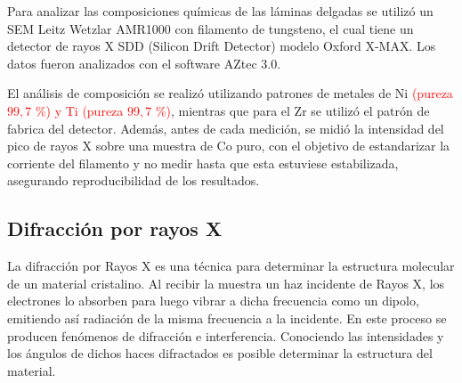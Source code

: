 \documentclass[12pt]{article}
\theoremstyle{definition}
\theoremstyle{remark}
\begin{document}
Para analizar las composiciones químicas de las láminas delgadas se utilizó un SEM Leitz Wetzlar AMR1000 con filamento de tungsteno, el cual tiene un detector de rayos X SDD (Silicon Drift Detector) modelo Oxford X-MAX. Los datos fueron analizados con el software AZtec 3.0.


El análisis de composición se realizó utilizando patrones de metales de Ni \textcolor{red}{(pureza $99,7$ \%) y Ti (pureza $99,7$ \%)}, mientras que para el Zr se utilizó el patrón de fabrica del detector. Además, antes de cada medición, se midió la intensidad del pico de rayos X sobre una muestra de Co puro, con el objetivo de estandarizar la corriente del filamento y no medir hasta que esta estuviese estabilizada, asegurando reproducibilidad de los resultados.


\subsection{Difracción por rayos X}
 La difracción por Rayos X es una técnica para determinar la estructura molecular de un material cristalino. Al recibir la muestra un haz incidente de Rayos X, los electrones lo absorben para luego vibrar a dicha frecuencia como un dipolo, emitiendo así radiación de la misma frecuencia a la incidente. En este proceso se producen fenómenos de difracción e interferencia.  Conociendo las intensidades y los ángulos de dichos haces difractados es posible determinar la estructura del material.
 
\begin{figure}[H]
\centering
{}
\caption{}
\label{Rxesquema}
\end{figure}
 
\end{document}
